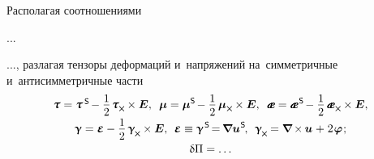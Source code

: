 \begin{otherlanguage}{russian}
Располагая соотношениями

...

..., разлагая тензоры деформаций и~напряжений на~симметричные и~антисимметричные части
\begin{equation}
\begin{array}{c}
\mathboldtau = \mathboldtau^{\hspace{.32ex}\mathsf{S}} \hspace{-0.25ex} - \displaystyle \onehalf \hspace{.2ex} \mathboldtau_{\hspace{-0.1ex}\Xcompanion} \hspace{-0.1ex} \times \bm{E} , \;\:
%
\bm{\mu} = \bm{\mu}^{\mathsf{S}} \hspace{-0.25ex} - \displaystyle \onehalf \hspace{.32ex} \bm{\mu}_{\Xcompanion} \hspace{-0.1ex} \times \bm{E} , \;\:
%
\mathboldae = \mathboldae^{\hspace{.12ex}\mathsf{S}} \hspace{-0.25ex} - \displaystyle \onehalf \hspace{.32ex} \mathboldae_{\Xcompanion} \hspace{-0.1ex} \times \bm{E} ,
\\[.6em]
%
\bm{\upgamma} = \mathboldepsilon - \displaystyle \onehalf \hspace{.32ex} \bm{\upgamma}_{\hspace{-0.16ex}\Xcompanion} \hspace{-0.1ex} \times \bm{E} , \:\:
%
\mathboldepsilon \equiv \bm{\upgamma}^{\hspace{.2ex}\mathsf{S}} \hspace{-0.32ex} = \hspace{-0.2ex} \boldnabla {\fieldofdisplacements}^{\hspace{0.1ex}\mathsf{S}} \hspace{-0.25ex} , \:\:
%
\bm{\upgamma}_{\hspace{-0.16ex}\Xcompanion} \hspace{-0.16ex}
= \boldnabla \hspace{-0.16ex} \times \hspace{-0.1ex} \fieldofdisplacements \hspace{.12ex} + \hspace{.12ex} 2 \hspace{.16ex} \fieldofrotations \hspace{.16ex} ;
\\[.6em]
%
\variation{\Pi} = \ldots
\end{array}
\end{equation}


\end{otherlanguage}
